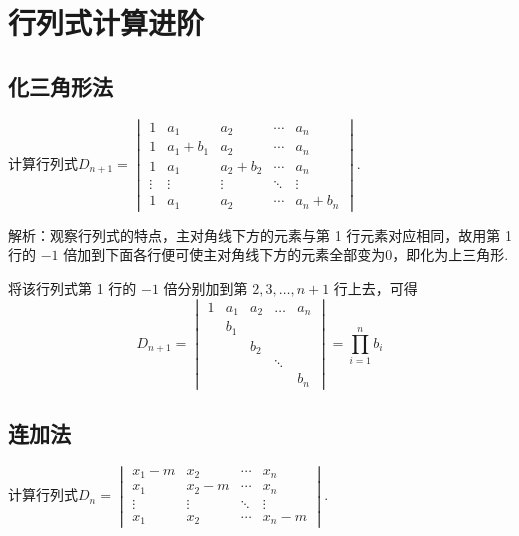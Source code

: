\chapter{行列式计算进阶}

\section{化三角形法}

\begin{example}
    计算行列式$D_{n+1}=\begin{vmatrix}
            1      & a_{1}       & a_{2}       & \cdots & a_n       \\
            1      & a_{1}+b_{1} & a_{2}       & \cdots & a_n       \\
            1      & a_{1}       & a_{2}+b_{2} & \cdots & a_n       \\
            \vdots & \vdots      & \vdots      & \ddots & \vdots    \\
            1      & a_{1}       & a_{2}       & \cdots & a_n+b_{n}
        \end{vmatrix}$.
\end{example}

解析：观察行列式的特点，主对角线下方的元素与第 1 行元素对应相同，故用第 1 行的 $-1$ 倍加到下面各行便可使主对角线下方的元素全部变为0，即化为上三角形.

\begin{solution}
    将该行列式第 1 行的 $-1$ 倍分别加到第 $2,3,\ldots,n+1$ 行上去，可得
    \[ D_{n+1}=\begin{vmatrix}
            1 & a_{1} & a_{2} & \ldots & a_n   \\
              & b_{1} &       &        &       \\
              &       & b_{2} &        &       \\
              &       &       & \ddots &       \\
              &       &       &        & b_{n}
        \end{vmatrix}=\prod_{i=1}^n b_i \]
\end{solution}

\section{连加法}

\begin{example}
    计算行列式$D_n=\begin{vmatrix}
            x_1-m  & x_2    & \cdots & x_n    \\
            x_1    & x_2-m  & \cdots & x_n    \\
            \vdots & \vdots & \ddots & \vdots \\
            x_1    & x_2    & \cdots & x_n-m
        \end{vmatrix}$.
\end{example}

